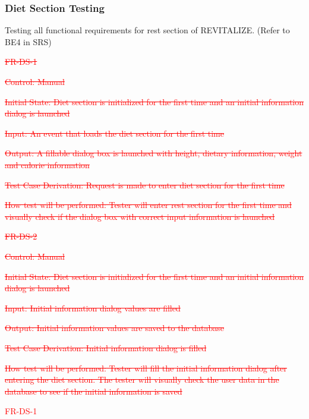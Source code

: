 \documentclass[12pt, titlepage]{article}
\begin{document}
\subsubsection{Diet Section Testing}

Testing all functional requirements for rest section of REVITALIZE. (Refer to BE4 in SRS)

\begin{enumerate}
	
\item{\textcolor{red}{\sout{FR-DS-1}}
	
\textcolor{red}{\sout{Control: Manual}}

\textcolor{red}{\sout{Initial State: Diet section is initialized for the first time and an initial information dialog is launched}}

\textcolor{red}{\sout{Input: An event that loads the diet section for the first time}}

\textcolor{red}{\sout{Output: A fillable dialog box is launched with height, dietary information, weight and calorie information}}

\textcolor{red}{\sout{Test Case Derivation: Request is made to enter diet section for the first time}}

\textcolor{red}{\sout{How test will be performed: Tester will enter rest section for the first time and visually check if the dialog box with correct input information is launched}}

\item{\textcolor{red}{\sout{FR-DS-2}}\\}

\textcolor{red}{\sout{Control: Manual}}

\textcolor{red}{\sout{Initial State: Diet section is initialized for the first time and an initial information dialog is launched}}

\textcolor{red}{\sout{Input: Initial information dialog values are filled}}

\textcolor{red}{\sout{Output: Initial information values are saved to the database}}

\textcolor{red}{\sout{Test Case Derivation: Initial information dialog is filled}}

\textcolor{red}{\sout{How test will be performed: Tester will fill the initial information dialog after entering the diet section. The tester will visually check the user data in the database to see if the initial information is saved}}
	
	\item{\textcolor{red}{FR-DS-1\\}}

}
\end{enumerate}
\end{document}
